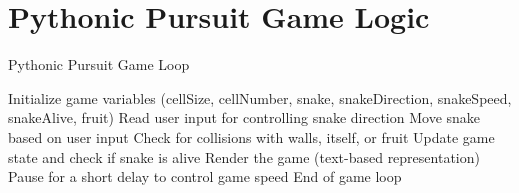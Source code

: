 \documentclass{article}
\begin{document}
\section{Pythonic Pursuit Game Logic}

\begin{algorithm}
  \caption{Pythonic Pursuit Game Loop}
  \begin{algorithmic}[1]
    \State Initialize game variables (cellSize, cellNumber, snake, snakeDirection, snakeSpeed, snakeAlive, fruit)
        \State Read user input for controlling snake direction
        \State Move snake based on user input
        \State Check for collisions with walls, itself, or fruit
        \State Update game state and check if snake is alive
        \State Render the game (text-based representation)
        \State Pause for a short delay to control game speed
    \EndWhile
    \State End of game loop
  \end{algorithmic}
\end{algorithm}
\end{document}
